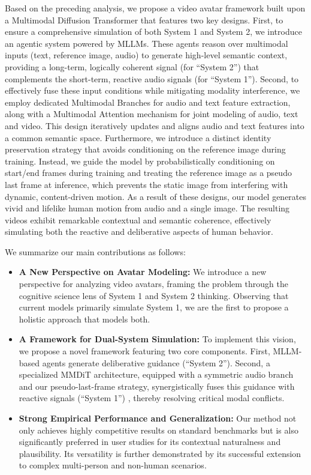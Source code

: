 Based on the preceding analysis, we propose a video avatar framework built upon a Multimodal Diffusion Transformer that features two key designs. First, to ensure a comprehensive simulation of both System 1 and System 2, we introduce an agentic system powered by MLLMs. These agents reason over multimodal inputs (text, reference image, audio) to generate high-level semantic context, providing a long-term, logically coherent signal (for ``System 2'') that complements the short-term, reactive audio signals (for ``System 1'').
Second, to effectively fuse these input conditions while mitigating modality interference, we employ dedicated Multimodal Branches for audio and text feature extraction, along with a Multimodal Attention mechanism for joint modeling of audio, text and video. This design iteratively updates and aligns audio and text features into a common semantic space. Furthermore, we introduce a distinct identity preservation strategy that avoids conditioning on the reference image during training. Instead, we guide the model by probabilistically conditioning on start/end frames during training and treating the reference image as a pseudo last frame at inference, which prevents the static image from interfering with dynamic, content-driven motion.
As a result of these designs, our model generates vivid and lifelike human motion from audio and a single image. The resulting videos exhibit remarkable contextual and semantic coherence, effectively simulating both the reactive and deliberative aspects of human behavior.

We summarize our main contributions as follows:
\begin{itemize}
    \item \textbf{A New Perspective on Avatar Modeling:} We introduce a new perspective for analyzing video avatars, framing the problem through the cognitive science lens of System 1 and System 2 thinking. Observing that current models primarily simulate System 1, we are the first to propose a holistic approach that models both.
    \item \textbf{A Framework for Dual-System Simulation:} To implement this vision, we propose a novel framework featuring two core components. First, MLLM-based agents generate deliberative guidance (``System 2''). Second, a specialized MMDiT architecture, equipped with a symmetric audio branch and our pseudo-last-frame strategy, synergistically fuses this guidance with reactive signals (``System 1'') , thereby resolving critical modal conflicts.
    \item \textbf{Strong Empirical Performance and Generalization:} Our method not only achieves highly competitive results on standard benchmarks but is also significantly preferred in user studies for its contextual naturalness and plausibility. Its versatility is further demonstrated by its successful extension to complex multi-person and non-human scenarios.
\end{itemize}


